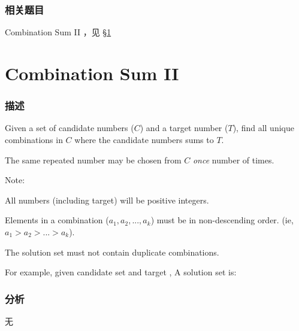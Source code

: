 \subsubsection{相关题目}
\begindot
\item Combination Sum II ，见 \S \ref{sec:combination-sum-ii}
\myenddot


\section{Combination Sum II} %
\label{sec:combination-sum-ii}


\subsubsection{描述}
Given a set of candidate numbers ($C$) and a target number ($T$), find all unique combinations in $C$ where the candidate numbers sums to $T$.

The same repeated number may be chosen from $C$ \emph{once} number of times.

Note:
\begindot
\item All numbers (including target) will be positive integers.
\item Elements in a combination ($a_1, a_2, ..., a_k$) must be in non-descending order. (ie, $a_1 > a_2 > ... > a_k$).
\item The solution set must not contain duplicate combinations.
\myenddot

For example, given candidate set  and target , 
A solution set is: 
\begin{Code}
[1, 7] 
[1, 2, 5] 
[2, 6] 
[1, 1, 6]
\end{Code}


\subsubsection{分析}
无


